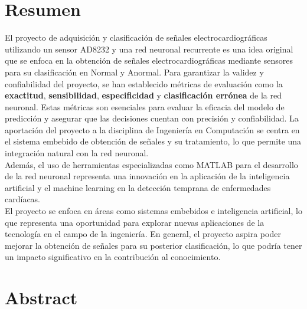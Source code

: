\chapter*{Resumen}

El proyecto de adquisición y clasificación de señales electrocardiográficas utilizando un sensor AD8232 y una red neuronal recurrente es una idea original que se enfoca en la obtención de señales electrocardiográficas mediante sensores para su clasificación en Normal y Anormal.
Para garantizar la validez y confiabilidad del proyecto, se han establecido métricas de evaluación como la \textbf{exactitud}, \textbf{sensibilidad}, \textbf{especificidad} y \textbf{clasificación errónea} de la red neuronal. 
Estas métricas son esenciales para evaluar la eficacia del modelo de predicción y asegurar que las decisiones cuentan con precisión y confiabilidad.
La aportación del proyecto a la disciplina de Ingeniería en Computación se centra en el sistema embebido de obtención de señales y su tratamiento, lo que permite una integración natural con la red neuronal.\\
Además, el uso de herramientas especializadas como MATLAB para el desarrollo de la red neuronal representa una innovación en la aplicación de la inteligencia artificial y el machine learning en la detección temprana de enfermedades cardíacas.\\
El proyecto se enfoca en áreas como sistemas embebidos e inteligencia artificial, lo que representa una oportunidad para explorar nuevas aplicaciones de la tecnología en el campo de la ingeniería. 
En general, el proyecto aspira poder mejorar la obtención de señales para su posterior clasificación, lo que podría tener un impacto significativo en la contribución al conocimiento.

{}

\chapter*{Abstract}


